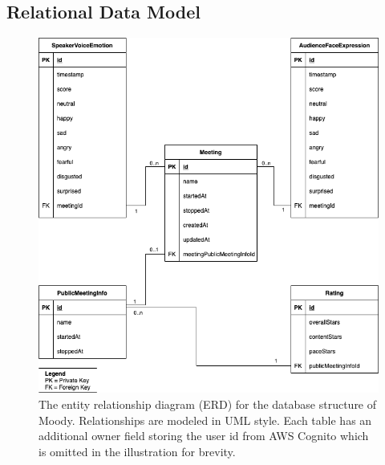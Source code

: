 \subsection*{Relational Data Model}
\label{app:appendix_relational_data_model}
\begin{figure}[ht]
\label{fig:erd}
\centering
\includegraphics[width=1\textwidth]{assets/erd.png}
\caption{The entity relationship diagram (ERD) for the database structure of Moody. Relationships are modeled in UML style. Each table has an additional owner field  storing the user id from AWS Cognito which is omitted in the illustration for brevity.}
\end{figure}
